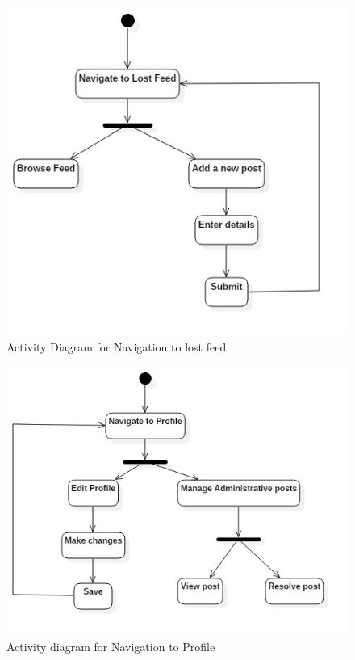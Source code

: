 \documentclass[a4paper,12pt]{article}
\begin{document}
{\begin{figure}[h!]
  \includegraphics[width=1\textwidth]{activity4}
  \caption{Activity Diagram for Navigation to lost feed}
\end{figure}
\begin{figure}[h!]
  \includegraphics[width=1\textwidth]{activity5}
  \caption{Activity diagram for Navigation to Profile}
\end{figure}
\begin{figure}[h!]

\end{figure}}
\end{document}
